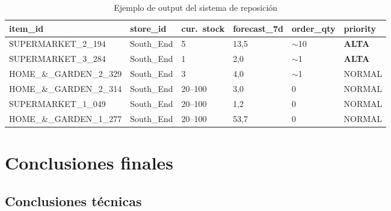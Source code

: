 \documentclass[12pt, a4paper, oneside]{report}
\begin{document}
\begin{table}[H]
  \centering
  \caption{Ejemplo de output del sistema de reposici\'on}
  \label{tab:replenishment}
  \begin{tabularx}{\textwidth}{L{3.5cm} L{2.2cm} C{2cm} C{2cm} C{2.5cm} C{1.5cm}}
    \toprule
    {\color{white}\textbf{item\_id}} &
    {\color{white}\textbf{store\_id}} &
    {\color{white}\textbf{cur.\ stock}} &
    {\color{white}\textbf{forecast\_7d}} &
    {\color{white}\textbf{order\_qty}} &
    {\color{white}\textbf{priority}} \\
    \midrule
       SUPERMARKET\_2\_194    & South\_End & 5      & 13,5 & $\sim$10 & \textbf{\color{red}ALTA} \\
      SUPERMARKET\_3\_284    & South\_End & 1      & 2,0  & $\sim$1  & \textbf{\color{red}ALTA} \\
       HOME\_\&\_GARDEN\_2\_329 & South\_End & 3    & 4,0  & $\sim$1  & NORMAL \\
      HOME\_\&\_GARDEN\_2\_314 & South\_End & 20--100 & 3,0 & 0       & NORMAL \\
       SUPERMARKET\_1\_049    & South\_End & 20--100 & 1,2 & 0        & NORMAL \\
      HOME\_\&\_GARDEN\_1\_277 & South\_End & 20--100 & 53,7 & 0      & NORMAL \\
    \bottomrule
  \end{tabularx}
\end{table}

\section{Conclusiones finales}

\subsection{Conclusiones t\'ecnicas}
\end{document}
